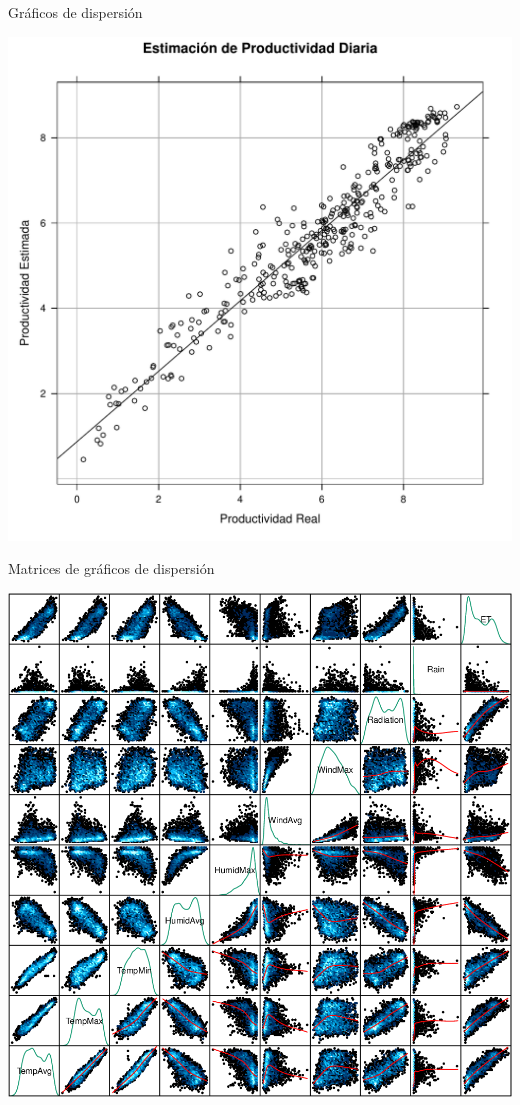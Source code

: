 \documentclass[xcolor={usenames,svgnames,dvipsnames}]{beamer}
\begin{document}
\begin{frame}[label={sec:org51f5429}]{Gráficos de dispersión}
\begin{center}
\includegraphics[width=.9\linewidth]{../figs/GraficoDispersion.pdf}
\end{center}
\end{frame}


\begin{frame}[label={sec:org6cb51c1}]{Matrices de gráficos de dispersión}
\begin{center}
\includegraphics[height=0.9\textheight]{../figs/Splom.png}
\end{center}
\end{frame}
\end{document}
